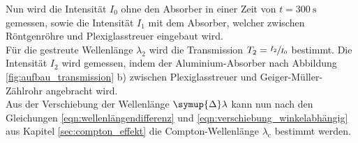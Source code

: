    Nun wird die Intensität $I_0$ ohne den Absorber in einer Zeit von $t = \SI{300}{\second}$ gemessen,
    sowie die Intensität $I_1$ mit dem Absorber,
    welcher zwischen Röntgenröhre und Plexiglasstreuer eingebaut wird.\\
    Für die gestreute Wellenlänge $\lambda_2$ wird die Transmission $T_2 = \sfrac{I_2}{I_0}$ bestimmt.
    Die Intensität $I_2$ wird gemessen, 
    indem der Aluminium-Absorber nach Abbildung \ref{fig:aufbau_transmission} b) zwischen Plexiglasstreuer und Geiger-Müller-Zählrohr angebracht wird.\\
    Aus der Verschiebung der Wellenlänge $\symup{\Delta}\lambda$ kann nun nach den Gleichungen \ref{eqn:wellenlängendifferenz} und \ref{eqn:verschiebung_winkelabhängig} aus Kapitel \ref{sec:compton_effekt} die Compton-Wellenlänge $\lambda_\text{c}$ bestimmt werden.
